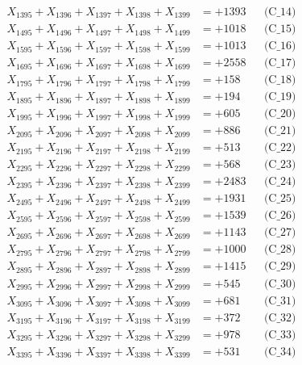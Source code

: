 \documentclass[a4paper,10pt]{article}
\begin{document}
{\begin{align}
X_{1395} + X_{1396} + X_{1397} + X_{1398} + X_{1399} &= +1393 && \text{(C\_14)} \\
X_{1495} + X_{1496} + X_{1497} + X_{1498} + X_{1499} &= +1018 && \text{(C\_15)} \\
\allowbreak
X_{1595} + X_{1596} + X_{1597} + X_{1598} + X_{1599} &= +1013 && \text{(C\_16)} \\
X_{1695} + X_{1696} + X_{1697} + X_{1698} + X_{1699} &= +2558 && \text{(C\_17)} \\
X_{1795} + X_{1796} + X_{1797} + X_{1798} + X_{1799} &= +158 && \text{(C\_18)} \\
X_{1895} + X_{1896} + X_{1897} + X_{1898} + X_{1899} &= +194 && \text{(C\_19)} \\
X_{1995} + X_{1996} + X_{1997} + X_{1998} + X_{1999} &= +605 && \text{(C\_20)} \\
\allowbreak
X_{2095} + X_{2096} + X_{2097} + X_{2098} + X_{2099} &= +886 && \text{(C\_21)} \\
X_{2195} + X_{2196} + X_{2197} + X_{2198} + X_{2199} &= +513 && \text{(C\_22)} \\
X_{2295} + X_{2296} + X_{2297} + X_{2298} + X_{2299} &= +568 && \text{(C\_23)} \\
X_{2395} + X_{2396} + X_{2397} + X_{2398} + X_{2399} &= +2483 && \text{(C\_24)} \\
X_{2495} + X_{2496} + X_{2497} + X_{2498} + X_{2499} &= +1931 && \text{(C\_25)} \\
\allowbreak
X_{2595} + X_{2596} + X_{2597} + X_{2598} + X_{2599} &= +1539 && \text{(C\_26)} \\
X_{2695} + X_{2696} + X_{2697} + X_{2698} + X_{2699} &= +1143 && \text{(C\_27)} \\
X_{2795} + X_{2796} + X_{2797} + X_{2798} + X_{2799} &= +1000 && \text{(C\_28)} \\
X_{2895} + X_{2896} + X_{2897} + X_{2898} + X_{2899} &= +1415 && \text{(C\_29)} \\
X_{2995} + X_{2996} + X_{2997} + X_{2998} + X_{2999} &= +545 && \text{(C\_30)} \\
\allowbreak
X_{3095} + X_{3096} + X_{3097} + X_{3098} + X_{3099} &= +681 && \text{(C\_31)} \\
X_{3195} + X_{3196} + X_{3197} + X_{3198} + X_{3199} &= +372 && \text{(C\_32)} \\
X_{3295} + X_{3296} + X_{3297} + X_{3298} + X_{3299} &= +978 && \text{(C\_33)} \\
X_{3395} + X_{3396} + X_{3397} + X_{3398} + X_{3399} &= +531 && \text{(C\_34)} \\

\end{align}}
\end{document}
